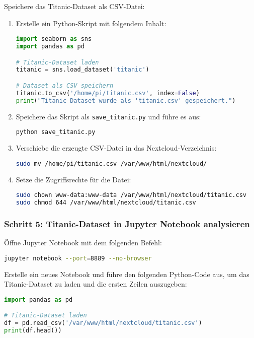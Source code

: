 \documentclass[a4paper,12pt]{article}
\begin{document}
Speichere das Titanic-Dataset als CSV-Datei:
\begin{enumerate}
    \item Erstelle ein Python-Skript mit folgendem Inhalt:
\begin{lstlisting}[language=Python]
import seaborn as sns
import pandas as pd

# Titanic-Dataset laden
titanic = sns.load_dataset('titanic')

# Dataset als CSV speichern
titanic.to_csv('/home/pi/titanic.csv', index=False)
print("Titanic-Dataset wurde als 'titanic.csv' gespeichert.")
\end{lstlisting}

    \item Speichere das Skript als \texttt{save\_titanic.py} und führe es aus:
\begin{lstlisting}[language=bash]
python save_titanic.py
\end{lstlisting}

    \item Verschiebe die erzeugte CSV-Datei in das Nextcloud-Verzeichnis:
\begin{lstlisting}[language=bash]
sudo mv /home/pi/titanic.csv /var/www/html/nextcloud/
\end{lstlisting}

    \item Setze die Zugriffsrechte für die Datei:
\begin{lstlisting}[language=bash]
sudo chown www-data:www-data /var/www/html/nextcloud/titanic.csv
sudo chmod 644 /var/www/html/nextcloud/titanic.csv
\end{lstlisting}
\end{enumerate}

\subsubsection{Schritt 5: Titanic-Dataset in Jupyter Notebook analysieren}
Öffne Jupyter Notebook mit dem folgenden Befehl:
\begin{lstlisting}[language=bash]
jupyter notebook --port=8889 --no-browser
\end{lstlisting}

Erstelle ein neues Notebook und führe den folgenden Python-Code aus, um das Titanic-Dataset zu laden und die ersten Zeilen auszugeben:
\begin{lstlisting}[language=Python]
import pandas as pd

# Titanic-Dataset laden
df = pd.read_csv('/var/www/html/nextcloud/titanic.csv')
print(df.head())
\end{lstlisting}
\end{document}
